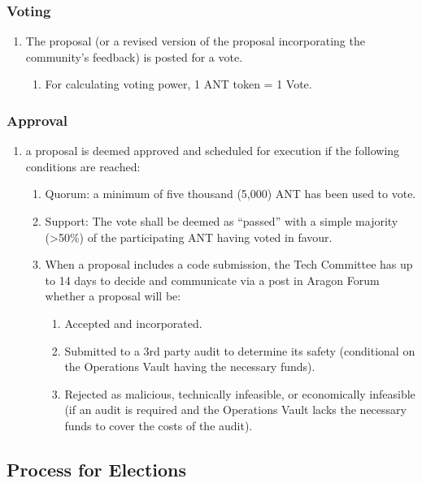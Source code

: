 \subsubsection*{Voting}
\begin{enumerate}
\item The proposal (or a revised version of the proposal incorporating the community’s feedback) is posted for a vote.
	\begin{enumerate}
		\item For calculating voting power, 1 \ac{ANT} token = 1 Vote.
	\end{enumerate}
\end{enumerate}

\subsubsection*{Approval} 
\begin{enumerate}
	\item a proposal is deemed approved and scheduled for execution if the following conditions are reached:
	\begin{enumerate}
		\item Quorum: a minimum of five thousand (5,000) \ac{ANT} has been used to vote.
		\item  Support: The vote shall be deemed as “passed” with a simple majority (>50\%) of the participating \ac{ANT} having voted in favour.
		\item When a proposal includes a code submission, the Tech Committee has up to 14 days to decide and communicate via a post in Aragon Forum whether a proposal will be:
		\begin{enumerate}
			\item Accepted and incorporated.
			\item Submitted to a 3rd party audit to determine its safety (conditional on the Operations Vault having the necessary funds).
			\item Rejected as malicious, technically infeasible, or economically infeasible (if an audit is required and the Operations Vault lacks the necessary funds to cover the costs of the audit).
		\end{enumerate}
	\end{enumerate}
\end{enumerate}


\subsection{Process for Elections}

